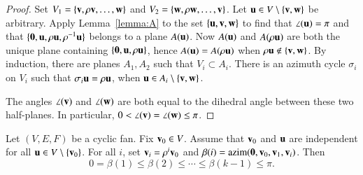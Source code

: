 \begin{proof}   Set $V_1 = \{{\mathbf v},\rho {\mathbf v},\ldots,{\mathbf w}\}$ and $V_2 = \{{\mathbf w},\rho {\mathbf w},\ldots,{\mathbf v}\}$. 
Let ${\mathbf u}\in V\setminus\{{\mathbf v},{\mathbf w}\}$ be arbitrary.
Apply Lemma~\ref{lemma:A} to the set $\{{\mathbf u},{\mathbf v},{\mathbf w}\}$ to find that $\angle({\mathbf u})=\pi$ and
that $\{{\mathbf 0},{\mathbf u},\rho {\mathbf u},\rho^{-1} {\mathbf u}\}$ belongs to a plane $A({\mathbf u})$.  Now $A({\mathbf u})$ and $A(\rho {\mathbf u})$ are both the unique plane containing $\{{\mathbf 0},{\mathbf u},\rho {\mathbf u}\}$, hence $A({\mathbf u}) = A(\rho {\mathbf u})$ 
when $\rho {\mathbf u}\not\in \{{\mathbf v},{\mathbf w}\}$.  By induction, there are planes $A_1, A_2$ such that $V_i\subset A_i$.  There is
an azimuth cycle $\sigma_i$ on $V_i$ such that $\sigma_i {\mathbf u} = \rho {\mathbf u}$, when ${\mathbf u} \in A_i\setminus \{{\mathbf v},{\mathbf w}\}$.  

The angles $\angle({\mathbf v})$ and $\angle({\mathbf w})$ are both equal to the dihedral angle between these two half-planes.  In particular, $0<\angle({\mathbf v})=\angle({\mathbf w})\le\pi$.
%
\end{proof}




\begin{lemma}[monotonicity]  \label{lemma:monotone}
Let $(V,E,F)$ be a cyclic fan. Fix ${\mathbf v}_0\in V$.  Assume that ${\mathbf v}_0$ and ${\mathbf u}$ are independent for all ${\mathbf u}\in V\setminus\{{\mathbf v}_0\}$.  For all $i$, set ${\mathbf v}_i = \rho^i {\mathbf v}_0$ and $\beta(i) = {\operatorname{azim}}({\mathbf 0},{\mathbf v}_0,{\mathbf v}_1,{\mathbf v}_i)$.
Then
$$0=\beta(1)\le \beta(2)\le \cdots\le \beta(k-1)\le\pi.$$
%
\end{lemma}

